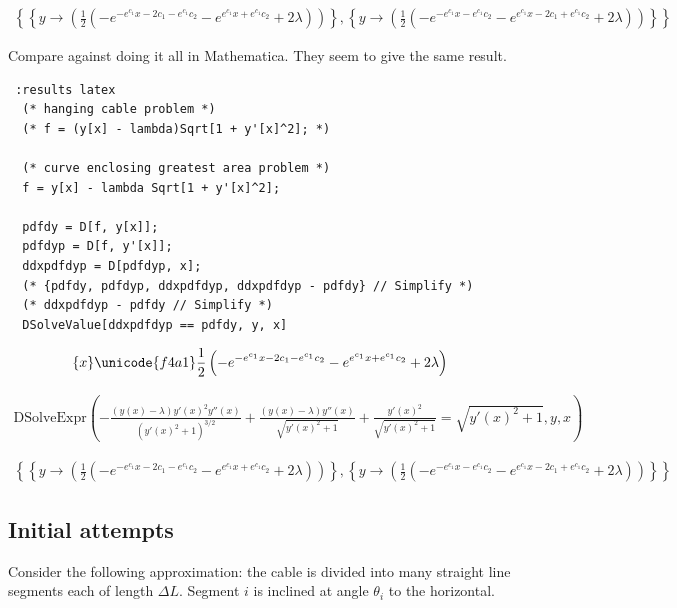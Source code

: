 \documentclass[12pt]{article}
\begin{document}
\begin{align*}
\left\{\left\{y\to \left(\frac{1}{2} \left(-e^{-e^{c_1} x-2 c_1-e^{c_1} c_2}-e^{e^{c_1} x+e^{c_1} c_2}+2 \lambda \right)\right)\right\},\left\{y\to \left(\frac{1}{2} \left(-e^{-e^{c_1} x-e^{c_1} c_2}-e^{e^{c_1} x-2 c_1+e^{c_1} c_2}+2 \lambda \right)\right)\right\}\right\}
\end{align*}

Compare against doing it all in Mathematica. They seem to give the same result.

\begin{verbatim} :results latex
  (* hanging cable problem *)
  (* f = (y[x] - lambda)Sqrt[1 + y'[x]^2]; *)

  (* curve enclosing greatest area problem *)
  f = y[x] - lambda Sqrt[1 + y'[x]^2];

  pdfdy = D[f, y[x]];
  pdfdyp = D[f, y'[x]];
  ddxpdfdyp = D[pdfdyp, x];
  (* {pdfdy, pdfdyp, ddxpdfdyp, ddxpdfdyp - pdfdy} // Simplify *)
  (* ddxpdfdyp - pdfdy // Simplify *)
  DSolveValue[ddxpdfdyp == pdfdy, y, x]
\end{verbatim}


\begin{align*}
\{x\}\unicode{f4a1}\frac{1}{2} \left(-e^{-e^{c_1} x-2 c_1-e^{c_1} c_2}-e^{e^{c_1} x+e^{c_1} c_2}+2 \lambda \right)
\end{align*}

\begin{align*}
\text{DSolveExpr}\left(-\frac{(y(x)-\lambda ) y'(x)^2 y''(x)}{\left(y'(x)^2+1\right)^{3/2}}+\frac{(y(x)-\lambda ) y''(x)}{\sqrt{y'(x)^2+1}}+\frac{y'(x)^2}{\sqrt{y'(x)^2+1}}=\sqrt{y'(x)^2+1},y,x\right)
\end{align*}

\begin{align*}
\left\{\left\{y\to \left(\frac{1}{2} \left(-e^{-e^{c_1} x-2 c_1-e^{c_1} c_2}-e^{e^{c_1} x+e^{c_1} c_2}+2 \lambda \right)\right)\right\},\left\{y\to \left(\frac{1}{2} \left(-e^{-e^{c_1} x-e^{c_1} c_2}-e^{e^{c_1} x-2 c_1+e^{c_1} c_2}+2 \lambda \right)\right)\right\}\right\}
\end{align*}

\subsection{Initial attempts}
Consider the following approximation: the cable is divided into many straight line segments each of
length $\Delta L$. Segment $i$ is inclined at angle $\theta_i$ to the horizontal.
\end{document}
